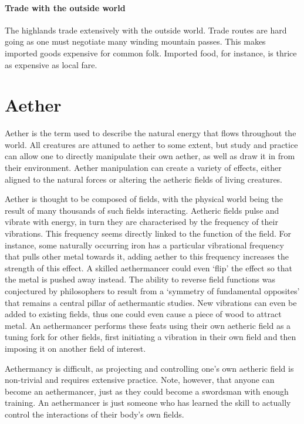 \documentclass[a4paper,11pt,oneside]{book}
\begin{document}
\subsubsection{Trade with the outside world}
The highlands trade extensively with the outside world. Trade routes are hard going as one must negotiate many winding mountain passes. This makes imported goods expensive for common folk. Imported food, for instance, is thrice as expensive as local fare. 

  



\chapter{Aether}
Aether is the term used to describe the natural energy that flows throughout the world. All creatures are attuned to aether to some extent, but study and practice can allow one to directly manipulate their own aether, as well as draw it in from their environment. Aether manipulation can create a variety of effects, either aligned to the natural forces or altering the aetheric fields of living creatures.

Aether is thought to be composed of fields, with the physical world being the result of many thousands of such fields interacting. Aetheric fields pulse and vibrate with energy, in turn they are characterised by the frequency of their vibrations. This frequency seems directly linked to the function of the field. For instance, some naturally occurring iron has a particular vibrational frequency that pulls other metal towards it, adding aether to this frequency increases the strength of this effect. A skilled aethermancer could even `flip' the effect so that the metal is pushed away instead. The ability to reverse field functions was conjectured by philosophers to result from a `symmetry of fundamental opposites' that remains a central pillar of aethermantic studies. New vibrations can even be added to existing fields, thus one could even cause a piece of wood to attract metal. An aethermancer performs these feats using their own aetheric field as a tuning fork for other fields, first initiating a vibration in their own field and then imposing it on another field of interest.

Aethermancy is difficult, as projecting and controlling one's own aetheric field is non-trivial and requires extensive practice. Note, however, that anyone can become an aethermancer, just as they could become a swordsman with enough training. An aethermancer is just someone who has learned the skill to actually control the interactions of their body's own fields. 
\end{document}
